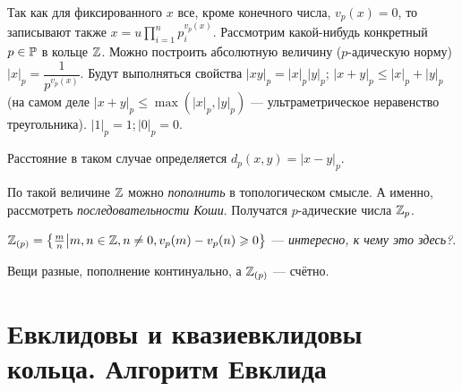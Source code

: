 \documentclass[a4paper]{report}
\begin{document}
    Так как для фиксированного $x$ все, кроме конечного числа, $v_p(x) = 0$, то записывают также $x = u \prod\limits_{i = 1}^{n}p_i^{v_p(x)}$.
    Рассмотрим какой-нибудь конкретный $p \in \P$ в кольце $\Z$.
    Можно построить абсолютную величину ($p$-адическую норму) $|x|_p = \dfrac{1}{p^{v_p(x)}}$.
    Будут выполняться свойства $|xy|_p = |x|_p|y|_p$; $|x + y|_p \le |x|_p + |y|_p$ (на самом деле $|x + y|_p \le \max(|x|_p, |y|_p)$ --- ультраметрическое неравенство треугольника).
    $|1|_p = 1; |0|_p = 0$.

    Расстояние в таком случае определяется $d_p(x, y) = |x - y|_p$.

    По такой величине $\Z$ можно \emph{пополнить} в топологическом смысле.
    А именно, рассмотреть \emph{последовательности Коши}.
    Получатся $p$-адические числа $\Z_p$.

    $\Z_{(p)} = \defset{\frac{m}{n}}{m, n \in \Z, n \ne 0, v_p(m) - v_p(n) \ge 0}$ --- \emph{интересно, к чему это здесь?}.

    Вещи разные, пополнение континуально, а $\Z_{(p)}$ --- счётно.


    \section{Евклидовы и квазиевклидовы кольца. Алгоритм Евклида}
\end{document}
